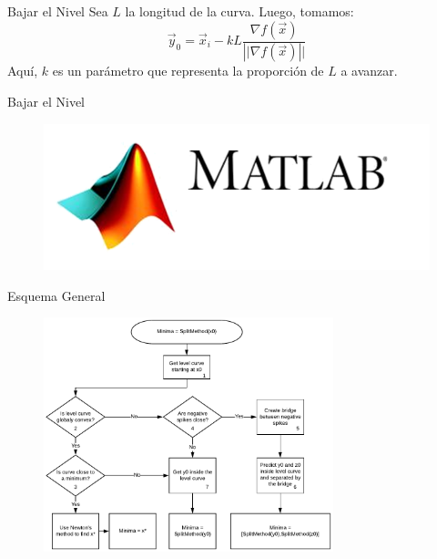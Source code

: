 \documentclass[fleqn]{beamer}\usepackage[]{graphicx}\usepackage[]{xcolor}
\begin{document}
\begin{frame}{Bajar el Nivel}
        Sea $L$ la longitud de la curva. Luego, tomamos:\\  $$\vec{y}_0 = \vec{x}_i-kL\frac{\nabla f(\vec{x})}{\left||\nabla f(\vec{x})\right||}$$ 
        \vspace{10 pt} 
        Aquí, $k$ es un parámetro que representa la proporción de $L$ a avanzar. 
\end{frame}

\begin{frame}{Bajar el Nivel}
    \begin{figure}
        \centering
        \includegraphics[width = \textwidth]{Logo.png}
        \label{fig:my_label}
    \end{figure}
\end{frame}


\begin{frame}{Esquema General}
    \begin{figure}
        \centering
        \includegraphics[width = 0.75\textwidth]{SplitMethod.pdf}
        \label{fig:my_label}
    \end{figure}
\end{frame}
\end{document}
